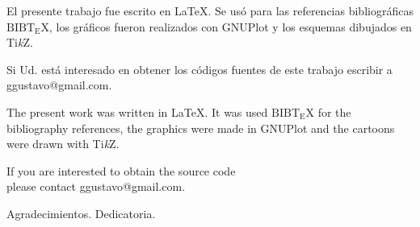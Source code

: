 \vspace*{\fill}
\begin{center}
	\begin{minipage}{0.70\textwidth}
	
    \begin{center}
	\scriptsize{
		El presente trabajo fue escrito en \LaTeX. Se usó para las referencias bibliográficas $\mathrm{B{\scriptstyle{IB}} \! T\!_{\displaystyle E} \! X}$, los gráficos fueron realizados con GNUPlot y los esquemas dibujados en Ti\textit{k}Z.
		
		\vspace*{1mm}
		
		Si Ud. está interesado en obtener los códigos fuentes de este trabajo escribir a \textcolor{grisoscuro}{ggustavo@gmail.com.}
		
		\vspace*{1cm}
		
		The present work was written in \LaTeX. It was used $\mathrm{B{\scriptstyle{IB}} \! T\!_{\displaystyle E} \! X}$ for the bibliography references, the graphics were made in GNUPlot and the cartoons were drawn with Ti\textit{k}Z.
			
		\vspace*{1mm}
		
		If you are interested to obtain the source code \\ please contact \textcolor{grisoscuro}{ggustavo@gmail.com.}
		}
	\end{center}

	\end{minipage}
\end{center}
\vfill
\cleardoublepage

\mtcaddchapter[Agradecimientos]
Agradecimientos. Dedicatoria.

\cleardoublepage

